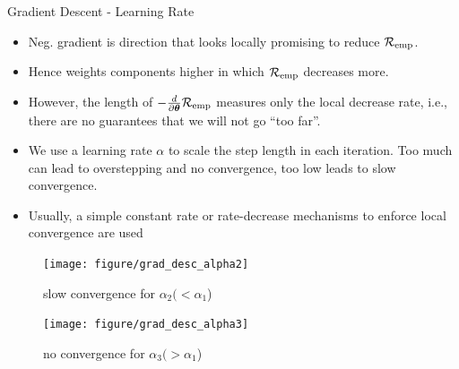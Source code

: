 \documentclass[11pt,compress,t,notes=noshow, xcolor=table]{beamer}
\begin{document}
\begin{vbframe}{Gradient Descent - Learning Rate}
\footnotesize
\begin{itemize}
\item Neg. gradient is direction that looks locally promising to reduce $\mathcal{R}_{\text{emp}}$. \\
\item Hence weights components higher
    in which $\mathcal{R}_{\text{emp}}$ decreases more. \\
\item However, the length of $-\frac{d}{\partial\bm{\theta}}{\mathcal{R}_{\text{emp}}}$ measures only the local decrease rate, i.e., there are no guarantees that we will not go ``too far''. \\
\item We use a learning rate $\alpha$ to scale the step length in each iteration. Too much can lead to overstepping and no convergence, too low leads to slow convergence.
\item Usually, a simple constant rate or rate-decrease mechanisms to enforce local convergence are used
\vspace{-2em}
\end{itemize}
\begin{figure}[!htb]
{
  \texttt{[image: figure/grad\_desc\_alpha2]}
  \caption*{\tiny slow convergence for $\alpha_2 (< \alpha_1$)}
}
{
  \texttt{[image: figure/grad\_desc\_alpha3]}
  \caption*{\tiny no convergence for $\alpha_3 (> \alpha_1$)}
}
\end{figure}

\end{vbframe}
\end{document}
